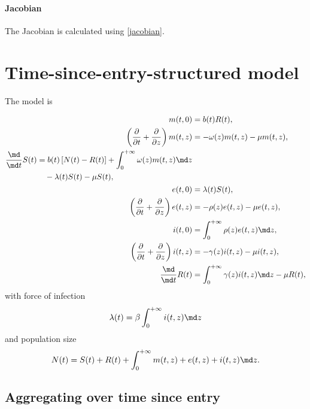 \documentclass{jpmarticle}
\let\subequationsorig\subequations%
\let\endsubequationsorig\endsubequations%
\renewenvironment{subequations}{
  \subequationsorig
  \renewcommand{\theequation}{\theparentequation.\arabic{equation}}
}{
  \endsubequationsorig
}
\begin{document}
\paragraph{Jacobian}

The Jacobian is calculated using \eqref{jacobian}.


\section{Time-since-entry-structured model}

The model is
\begin{subequations}
  \label{model_time_since_entry_structured}
  \begin{align}
    m(t, 0) &=
    b(t) R(t),
    \\
    \left(\frac{\partial}{\partial t}
      + \frac{\partial}{\partial z}\right)
    m(t, z) &=
    - \omega(z) m(t, z) - \mu m(t, z),
    \\
    \begin{split}
      \frac{\md}{\md t} S(t) &=
      b(t) \left[N(t) - R(t)\right]
      + \int_0^{+\infty} \omega(z) m(t, z) \md z
      \\ & \quad {}
      - \lambda(t) S(t) - \mu S(t),
    \end{split}
    \\
    e(t, 0) &=
    \lambda(t) S(t),
    \\
    \left(\frac{\partial}{\partial t}
      + \frac{\partial}{\partial z}\right)
    e(t, z) &=
    - \rho(z) e(t, z) - \mu e(t, z),
    \\
    i(t, 0) &=
    \int_0^{+\infty} \rho(z) e(t, z) \md z,
    \\
    \left(\frac{\partial}{\partial t}
      + \frac{\partial}{\partial z}\right)
    i(t, z) &=
    - \gamma(z) i(t, z) - \mu i(t, z),
    \\
    \frac{\md}{\md t} R(t) &=
    \int_0^{+\infty} \gamma(z) i(t, z) \md z
    - \mu R(t),
  \end{align}
  with force of infection
  \begin{equation}
    \lambda(t) = \beta \int_0^{+\infty} i(t, z) \md z
  \end{equation}
  and population size
  \begin{equation}
    N(t) =
    S(t) + R(t)
    + \int_0^{+\infty} m(t, z) + e(t, z) + i(t, z) \md z.
  \end{equation}
\end{subequations}


\subsection{Aggregating over time since entry}
\end{document}
